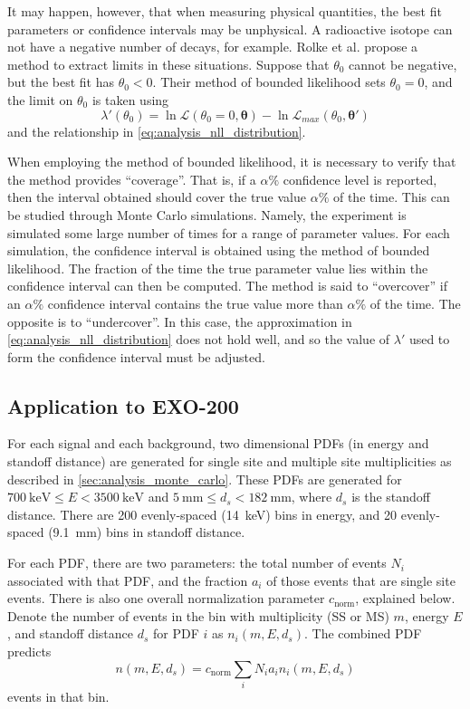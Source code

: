 \documentclass[herrin-thesis.tex]{subfiles}
\begin{document}
It may happen, however, that when measuring physical quantities, the best fit parameters or confidence intervals may be unphysical. A radioactive isotope can not have a negative number of decays, for example. Rolke et al.\cite{Rolke:2005uq} propose a method to extract limits in these situations. Suppose that \(\theta_0\) cannot be negative, but the best fit has \(\theta_0 < 0\). Their method of bounded likelihood sets \(\theta_0 = 0\), and the limit on \(\theta_0\) is taken using
\begin{equation}
\lambda'({\theta_0}) = \ln \mathcal{L}(\theta_0 = 0, \boldsymbol{\theta}) - \ln \mathcal{L}_{max}(\theta_0, \boldsymbol{\theta}')
\end{equation}
and the relationship in \cref{eq:analysis_nll_distribution}.

When employing the method of bounded likelihood, it is necessary to verify that the method provides ``coverage''. That is, if a \(\alpha\%\) confidence level is reported, then the interval obtained should cover the true value \(\alpha\%\) of the time. This can be studied through Monte Carlo simulations. Namely, the experiment is simulated some large number of times for a range of parameter values. For each simulation, the confidence interval is obtained using the method of bounded likelihood. The fraction of the time the true parameter value lies within the confidence interval can then be computed. The method is said to ``overcover'' if an \(\alpha\%\) confidence interval contains the true value more than \(\alpha\%\) of the time. The opposite is to ``undercover''. In this case, the approximation in \cref{eq:analysis_nll_distribution} does not hold well, and so the value of \(\lambda'\) used to form the confidence interval must be adjusted.

\subsection{Application to EXO-200}

For each signal and each background, two dimensional PDFs (in energy and standoff distance) are generated for single site and multiple site multiplicities as described in \cref{sec:analysis_monte_carlo}. These PDFs are generated for \(\SI{700}{\keV} \leq E < \SI{3500}{\keV}\) and \(\SI{5}{\mm} \leq d_s < \SI{182}{\mm}\), where \(d_s\) is the standoff distance. There are 200 evenly-spaced (\SI{14}{\keV}) bins in energy, and 20 evenly-spaced (\SI{9.1}{\mm}) bins in standoff distance.

For each PDF, there are two parameters: the total number of events \(N_i\) associated with that PDF, and the fraction \(a_i\) of those events that are single site events. There is also one overall normalization parameter \(c_\text{norm}\), explained below. Denote the number of events in the bin with multiplicity (SS or MS) \(m\), energy \(E\), and standoff distance \(d_s\) for PDF \(i\) as \(n_i(m, E, d_s)\). The combined PDF predicts
\begin{equation}
n(m, E, d_s) = c_\text{norm}\sum_i N_i a_i n_i(m, E, d_s)
\label{eq:analysis_sum_pdf}
\end{equation}
events in that bin.
\end{document}
